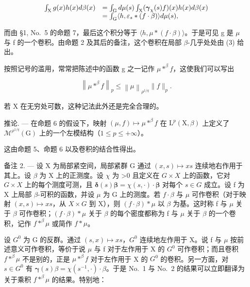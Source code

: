 \[
\begin{array}{r l} \int_ {\mathrm{X}} g (x) h (x) d \beta (x) & = \int_ {\mathrm{G}} d \mu (s) \int_ {\mathrm{X}} (\boldsymbol {\gamma} _ {\chi} (s) f) (x) h (x) d \beta (x) \\ & = \int_ {\mathrm{G}} \langle h, \varepsilon_ {s} * (f \cdot \beta) \rangle d \mu (s), \end{array}
\]

而由 §1, No.~5 的命题 7，最后这个积分等于 \(\langle h, \mu * (f \cdot \beta) \rangle\)。于是可见 g 是 \(\mu\) 与 f 的一个卷积。由命题 2 及其后的备注，这个卷积在局部 \(\beta\)-几乎处处由 (3) 给出。

按照记号的滥用，常常把陈述中的函数 g 之一记作 \(\mu * ^ {\beta} f\)，这使我们可以写出

\[
\left\| \mu * ^ {\beta} f \right\| _ {p} \leqslant \left\| \mu \right\| _ {\rho^ {1 / q}} \| f \| _ {p}.
\]

若 X 在无穷处可数，这种记法此外还是完全合理的。

推论. --- 在命题 6 的假设下，映射 \((\mu, f) \mapsto \mu *^{\beta} f\) 在 \(\mathrm{L}^{p}(\mathrm{X}, \beta)\) 上定义了 \(\mathcal{M}^{\rho^{1/q}}(\mathrm{G})\) 上的一个左模结构（\(1 \leqslant p \leqslant +\infty\)）。

这由命题 5、命题 6 以及卷积的结合性得出。

备注 2. --- 设 X 为局部紧空间，局部紧群 G 通过 \((x,s)\mapsto xs\) 连续地右作用于其上。设 \(\beta\) 为 X 上的正测度。设 \(\chi\) 为 \textgreater0 且定义在 \(G\times X\) 上的函数，它对 \(G\times X\) 上的每个测度可测，且 \(\boldsymbol{\delta}(s)\boldsymbol{\beta}=\chi(s,\cdot)\cdot\boldsymbol{\beta}\) 对每个 \(s\in G\) 成立。设 f 为 X 上局部 \(\beta\)-可积的函数，并设 \(\mu\) 为 G 上的测度。若 \(f\cdot\beta\) 与 \(\mu\) 可作卷积（对于映射 \((x,s)\mapsto xs\)，从 \(X\times G\) 到 X），则 \((f\cdot\beta)*\mu\) 以 \(\beta\) 为基。这时称 f 与 \(\mu\) 关于 \(\beta\) 可作卷积；\((f\cdot\beta)*\mu\) 关于 \(\beta\) 的每个密度都称为 f 与 \(\mu\) 关于 \(\beta\) 的一个卷积，记作 \(f * ^ {\beta} \mu\) 或简作 \(f*\mu\)。

设 \(G^{0}\) 为 G 的反群。通过 \((s,x)\mapsto xs\)，\(G^{0}\) 连续地左作用于 X。说 f 与 \(\mu\) 按前述意义可作卷积，等价于说 \(\mu\) 与 f 对于左作用于 X 的 \(G^{0}\) 可作卷积；而且卷积 \(f * ^ {\beta} \mu\) 不是别的，正是 \(\mu * ^ {\beta} f\) 对于左作用于 X 的 \(G^{0}\) 的卷积。另一方面，对 \(s\in G^{0}\) 有 \(\pmb{\gamma}(s)\beta = \chi(s^{-1},\cdot)\cdot \beta\)。于是 No.~1 与 No.~2 的结果可以立即翻译为关于乘积 \(f * ^ {\beta} \mu\) 的结果。特别地：

